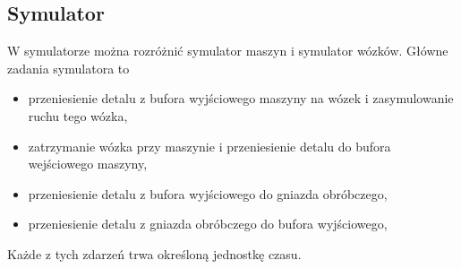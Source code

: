 \documentclass[10pt, a4paper]{article}
\begin{document}
\subsection{Symulator}
W symulatorze można rozróżnić symulator maszyn i symulator wózków. Główne zadania symulatora to
\begin{itemize}
\item przeniesienie detalu z bufora wyjściowego maszyny na wózek i zasymulowanie ruchu tego wózka,
\item zatrzymanie wózka przy maszynie i przeniesienie detalu do bufora wejściowego maszyny,
\item przeniesienie detalu z bufora wyjściowego do gniazda obróbczego,
\item przeniesienie detalu z gniazda obróbczego do bufora wyjściowego,
\end{itemize}
Każde z tych zdarzeń trwa określoną jednostkę czasu.
\end{document}
